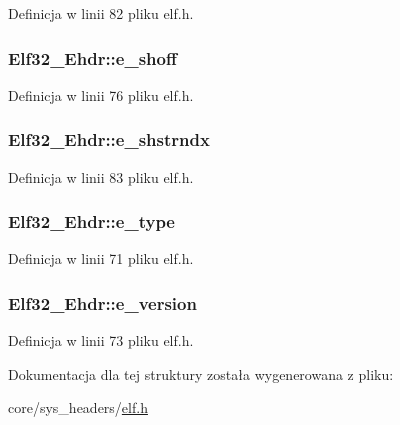 Definicja w linii 82 pliku elf.\-h.

\hypertarget{struct_elf32___ehdr_a00601af5187a1b3f8babfe9cddd95c15}{
\subsubsection[{e\-\_\-shoff}]{ Elf32\-\_\-\-Ehdr\-::e\-\_\-shoff}}\label{struct_elf32___ehdr_a00601af5187a1b3f8babfe9cddd95c15}


Definicja w linii 76 pliku elf.\-h.

\hypertarget{struct_elf32___ehdr_a3b3070ccd7d971e8cb6ea58d4c6fab09}{
\subsubsection[{e\-\_\-shstrndx}]{ Elf32\-\_\-\-Ehdr\-::e\-\_\-shstrndx}}\label{struct_elf32___ehdr_a3b3070ccd7d971e8cb6ea58d4c6fab09}


Definicja w linii 83 pliku elf.\-h.

\hypertarget{struct_elf32___ehdr_a49e40a791813c06e3b6ebcb53aef1bb8}{
\subsubsection[{e\-\_\-type}]{ Elf32\-\_\-\-Ehdr\-::e\-\_\-type}}\label{struct_elf32___ehdr_a49e40a791813c06e3b6ebcb53aef1bb8}


Definicja w linii 71 pliku elf.\-h.

\hypertarget{struct_elf32___ehdr_aa27627bda53281221325df4dd782e800}{
\subsubsection[{e\-\_\-version}]{ Elf32\-\_\-\-Ehdr\-::e\-\_\-version}}\label{struct_elf32___ehdr_aa27627bda53281221325df4dd782e800}


Definicja w linii 73 pliku elf.\-h.



Dokumentacja dla tej struktury została wygenerowana z pliku\-:\begin{DoxyCompactItemize}
\item 
core/sys\-\_\-headers/\hyperlink{elf_8h}{elf.\-h}\end{DoxyCompactItemize}
